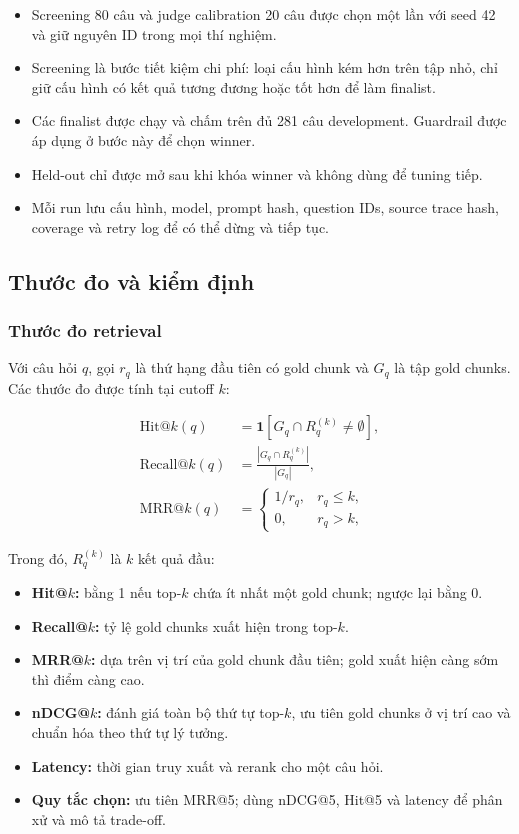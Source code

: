 \begin{itemize}
  \item Screening 80 câu và judge calibration 20 câu được chọn một lần với seed
  42 và giữ nguyên ID trong mọi thí nghiệm.
  \item Screening là bước tiết kiệm chi phí: loại cấu hình kém hơn trên tập nhỏ,
  chỉ giữ cấu hình có kết quả tương đương hoặc tốt hơn để làm finalist.
  \item Các finalist được chạy và chấm trên đủ 281 câu development. Guardrail
  được áp dụng ở bước này để chọn winner.
  \item Held-out chỉ được mở sau khi khóa winner và không dùng để tuning tiếp.
  \item Mỗi run lưu cấu hình, model, prompt hash, question IDs, source trace
  hash, coverage và retry log để có thể dừng và tiếp tục.
\end{itemize}

\subsection{Thước đo và kiểm định}

\subsubsection{Thước đo retrieval}

Với câu hỏi $q$, gọi $r_q$ là thứ hạng đầu tiên có gold chunk và $G_q$ là tập
gold chunks. Các thước đo được tính tại cutoff $k$:

\begin{align}
  \mathrm{Hit@}k(q) &= \mathbf{1}\!\left[G_q \cap R_q^{(k)} \neq \emptyset\right],\\
  \mathrm{Recall@}k(q) &= \frac{|G_q \cap R_q^{(k)}|}{|G_q|},\\
  \mathrm{MRR@}k(q) &=
  \begin{cases}
    1/r_q, & r_q \leq k,\\
    0, & r_q > k,
  \end{cases}
\end{align}

Trong đó, $R_q^{(k)}$ là $k$ kết quả đầu:

\begin{itemize}
  \item \textbf{Hit@$k$:} bằng 1 nếu top-$k$ chứa ít nhất một gold chunk; ngược
  lại bằng 0.
  \item \textbf{Recall@$k$:} tỷ lệ gold chunks xuất hiện trong top-$k$.
  \item \textbf{MRR@$k$:} dựa trên vị trí của gold chunk đầu tiên; gold xuất
  hiện càng sớm thì điểm càng cao.
  \item \textbf{nDCG@$k$:} đánh giá toàn bộ thứ tự top-$k$, ưu tiên gold chunks
  ở vị trí cao và chuẩn hóa theo thứ tự lý tưởng.
  \item \textbf{Latency:} thời gian truy xuất và rerank cho một câu hỏi.
  \item \textbf{Quy tắc chọn:} ưu tiên MRR@5; dùng nDCG@5, Hit@5 và latency để
  phân xử và mô tả trade-off.
\end{itemize}


